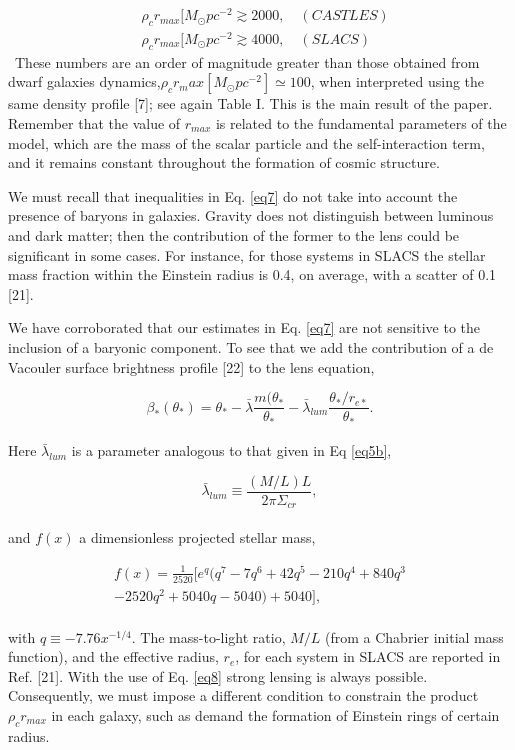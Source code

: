 \documentclass[10pt,a4paper]{article}
\begin{document}
\begin{multicols}{2}
\begin{align} \label{eq7}
&\rho_c r_{max}[M_{\odot}pc^{-2}\gtrsim 2000, \quad (CASTLES) \\
&\rho_c r_{max}[M_{\odot}pc^{-2}\gtrsim 4000, \quad (SLACS) \tag{7b} \label{eq7b}
\end{align}
\
These numbers are an order of magnitude greater than those obtained from dwarf galaxies dynamics,$\rho_{c} r_max[M_{\odot}pc^{-2}]\simeq 100$, when interpreted using the same
density profile [7]; see again Table I. This is the main result of the paper. Remember that the value of $r_{max}$ is related to the fundamental parameters of the model, which are the mass of the scalar particle and the self-interaction term, and it remains constant throughout the formation of cosmic structure.\

We must recall that inequalities in Eq. \eqref{eq7} do not take into account the presence of baryons in galaxies. Gravity does not distinguish between luminous and dark matter; then the contribution of the former to the lens could be significant in some cases. For instance, for those systems in SLACS the stellar mass fraction within the Einstein radius is 0.4, on average, with a scatter of 0.1 [21].\

We have corroborated that our estimates in Eq. \eqref{eq7} are not sensitive to the inclusion of a baryonic component. To see that we add the contribution of a de Vacouler surface brightness profile [22] to the lens equation,

\begin{equation} \label{eq8}
\beta_{\ast}(\theta_{\ast}) = \theta_{\ast}-\bar{\lambda}\frac{m(\theta_{\ast}}{\theta_{\ast}} - \bar{\lambda}_{lum} \frac{\theta_{\ast}/r_{e\ast}}{\theta_{\ast}}.
\end{equation}\\
Here $\bar{\lambda}_{lum}$ is a parameter analogous to that given in Eq \eqref{eq5b},

\begin{equation} \label{eq8b} \tag{8b}
\bar{\lambda}_{lum} \equiv \frac{(M/L)L}{2\pi\Sigma_{cr}},
\end{equation}\\
and $f(x)$ a dimensionless projected stellar mass,
 
\begin{multline}\tag{8c} \label{eq8c}
f(x) = \frac{1}{2520}[e^q(q^7 - 7q^6 + 42q^5 - 210q^4 + 840q^3 \\ 
-2520q^2 + 5040q - 5040)+ 5040],
\end{multline}\\
with $q \equiv -7.76x^{-1/4}$. The mass-to-light ratio, $M/L$ (from a Chabrier initial mass function), and the effective radius, $r_{e}$, for each system in SLACS are reported in Ref. [21]. With the use of Eq. \eqref{eq8} strong lensing is always possible. Consequently, we must impose a different condition to constrain the product $\rho_{c}r_{max}$ in each galaxy, such as demand the formation of Einstein rings of certain radius.\


\end{multicols}
\end{document}
